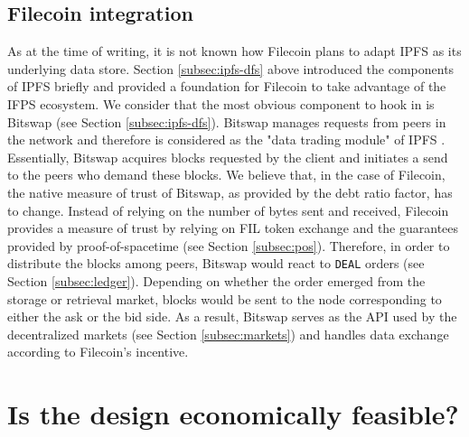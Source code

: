 \documentclass[conference]{IEEEtran}
\begin{document}
\subsection{Filecoin integration}
As at the time of writing, it is not known how Filecoin plans to adapt IPFS as its underlying data store.
Section \ref{subsec:ipfs-dfs} above introduced the components of IPFS briefly and provided a foundation for Filecoin to take advantage of the IFPS ecosystem.
We consider that the most obvious component to hook in is Bitswap (see Section \ref{subsec:ipfs-dfs}).
Bitswap manages requests from peers in the network and therefore is considered as the "data trading module" of IPFS \cite{bitswap}.
Essentially, Bitswap acquires blocks requested by the client and initiates a send to the peers who demand these blocks.
We believe that, in the case of Filecoin, the native measure of trust of Bitswap, as provided by the debt ratio factor, has to change.
Instead of relying on the number of bytes sent and received, Filecoin provides a measure of trust by relying on FIL token exchange and the guarantees provided by proof-of-spacetime (see Section \ref{subsec:pos}).
Therefore, in order to distribute the blocks among peers, Bitswap would react to \texttt{DEAL} orders (see Section \ref{subsec:ledger}).
Depending on whether the order emerged from the storage or retrieval market, blocks would be sent to the node corresponding to either the ask or the bid side.
As a result, Bitswap serves as the API used by the decentralized markets (see Section \ref{subsec:markets}) and handles data exchange according to Filecoin's incentive.

\section{Is the design economically feasible?}
\label{sec:eco-feasibility}
\end{document}
